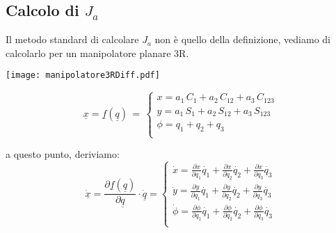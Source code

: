 \subsection{Calcolo di $J_a$}
Il metodo standard di calcolare $J_a$ non è quello della definizione, vediamo di calcolarlo per un manipolatore planare 3R.

\begin{center}
\texttt{[image: manipolatore3RDiff.pdf]}
\end{center}

\begin{equation}
	\underline{x} = \underline{f}(\underline{q}) \,=\,
	\begin{cases}
		x = a_1\,C_1 + a_2\,C_{12} + a_3\,C_{123} \\
		y = a_1\,S_1 + a_2\,S_{12} + a_3\,S_{123} \\
		\phi = q_1 + q_2 + q_3 \\
	\end{cases}
\end{equation}

a questo punto, deriviamo:
\begin{equation}
	\dot{\underline{x}} =   \frac{\partial \underline{f}(\underline{q})}{\partial \underline{q}} \cdot \underline{\dot{q}} = 
	\begin{cases}
		\dot{x} = \frac{\partial x}{\partial q_1} \dot{q_1} + \frac{\partial x}{\partial q_2} \dot{q_2} + \frac{\partial x}{\partial q_3} \dot{q_3} \\
		\dot{y} = \frac{\partial y}{\partial q_1} \dot{q_1} + \frac{\partial y}{\partial q_2} \dot{q_2} + \frac{\partial y}{\partial q_3} \dot{q_3} \\
		\dot{\phi} = \frac{\partial \phi}{\partial q_1} \dot{q_1} + \frac{\partial \phi}{\partial q_2} \dot{q_2} + \frac{\partial \phi}{\partial q_3} \dot{q_3} \\
	\end{cases}
\end{equation}

